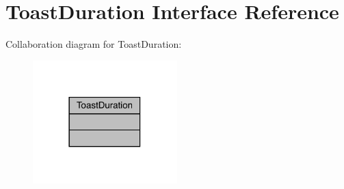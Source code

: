 \hypertarget{interfacecom_1_1toast_1_1android_1_1gamebase_1_1base_1_1annotation_1_1_toast_duration}{}\section{Toast\+Duration Interface Reference}
\label{interfacecom_1_1toast_1_1android_1_1gamebase_1_1base_1_1annotation_1_1_toast_duration}


Collaboration diagram for Toast\+Duration\+:
\nopagebreak
\begin{figure}[H]
\begin{center}
\leavevmode
\includegraphics[width=158pt]{interfacecom_1_1toast_1_1android_1_1gamebase_1_1base_1_1annotation_1_1_toast_duration__coll__graph}
\end{center}
\end{figure}
